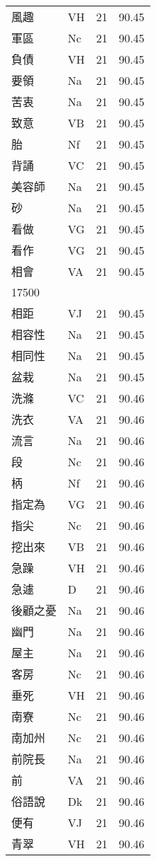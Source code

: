 \documentclass[twocolumn]{book}
\begin{document}
\begin{supertabular}{llrr}
風趣 & VH & 21 &  90.45\\
軍區 & Nc & 21 &  90.45\\
負債 & VH & 21 &  90.45\\
要領 & Na & 21 &  90.45\\
苦衷 & Na & 21 &  90.45\\
致意 & VB & 21 &  90.45\\
胎 & Nf & 21 &  90.45\\
背誦 & VC & 21 &  90.45\\
美容師 & Na & 21 &  90.45\\
砂 & Na & 21 &  90.45\\
看做 & VG & 21 &  90.45\\
看作 & VG & 21 &  90.45\\
相會 & VA & 21 &  90.45\\
17500\\
相距 & VJ & 21 &  90.45\\
相容性 & Na & 21 &  90.45\\
相同性 & Na & 21 &  90.45\\
盆栽 & Na & 21 &  90.45\\
洗滌 & VC & 21 &  90.46\\
洗衣 & VA & 21 &  90.46\\
流言 & Na & 21 &  90.46\\
段 & Nc & 21 &  90.46\\
柄 & Nf & 21 &  90.46\\
指定為 & VG & 21 &  90.46\\
指尖 & Nc & 21 &  90.46\\
挖出來 & VB & 21 &  90.46\\
急躁 & VH & 21 &  90.46\\
急遽 & D & 21 &  90.46\\
後顧之憂 & Na & 21 &  90.46\\
幽門 & Na & 21 &  90.46\\
屋主 & Na & 21 &  90.46\\
客房 & Nc & 21 &  90.46\\
垂死 & VH & 21 &  90.46\\
南寮 & Nc & 21 &  90.46\\
南加州 & Nc & 21 &  90.46\\
前院長 & Na & 21 &  90.46\\
前 & VA & 21 &  90.46\\
俗語說 & Dk & 21 &  90.46\\
便有 & VJ & 21 &  90.46\\
青翠 & VH & 21 &  90.46\\

\end{supertabular}
\end{document}
